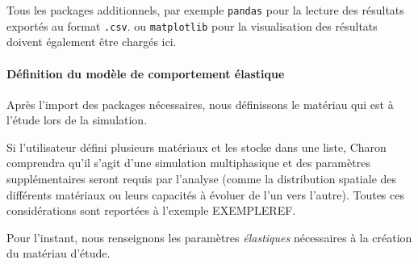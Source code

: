 \documentclass[10pt]{book}
\begin{document}
Tous les packages additionnels, par exemple \texttt{pandas} pour la lecture des résultats exportés au format \texttt{.csv}. ou \texttt{matplotlib} pour la visualisation des résultats doivent également être chargés ici.
\paragraph{Définition du modèle de comportement élastique} Après l'import des packages nécessaires, nous définissons le matériau qui est à l'étude lors de la simulation. 

Si l'utilisateur défini plusieurs matériaux et les stocke dans une liste, Charon comprendra qu'il s'agit d'une simulation multiphasique et des paramètres supplémentaires seront requis par l'analyse (comme la distribution spatiale des différents matériaux ou leurs capacités à évoluer de l'un vers l'autre). Toutes ces considérations sont reportées à l'exemple EXEMPLEREF.

Pour l'instant, nous renseignons les paramètres \emph{élastiques} nécessaires à la création du matériau d'étude.
\end{document}
